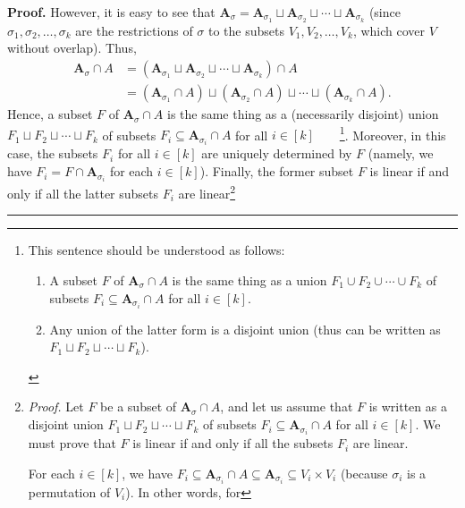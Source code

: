 \documentclass[numbers=enddot,12pt,final,onecolumn,notitlepage]{scrartcl}%
\numberwithin{exer}{section}
\theoremstyle{definition}
\newenvironment{proof}[1][Proof]{\noindent\textbf{#1.} }{\ \rule{0.5em}{0.5em}}
\newenvironment{vershort}{}{}
\begin{document}
\begin{vershort}
\begin{proof}
However, it is easy to see that $\mathbf{A}_{\sigma}=\mathbf{A}_{\sigma_{1}%
}\sqcup\mathbf{A}_{\sigma_{2}}\sqcup\cdots\sqcup\mathbf{A}_{\sigma_{k}}$
(since $\sigma_{1},\sigma_{2},\ldots,\sigma_{k}$ are the restrictions of
$\sigma$ to the subsets $V_{1},V_{2},\ldots,V_{k}$, which cover $V$ without
overlap). Thus,%
\begin{align*}
\mathbf{A}_{\sigma}\cap A  &  =\left(  \mathbf{A}_{\sigma_{1}}\sqcup
\mathbf{A}_{\sigma_{2}}\sqcup\cdots\sqcup\mathbf{A}_{\sigma_{k}}\right)  \cap
A\\
&  =\left(  \mathbf{A}_{\sigma_{1}}\cap A\right)  \sqcup\left(  \mathbf{A}%
_{\sigma_{2}}\cap A\right)  \sqcup\cdots\sqcup\left(  \mathbf{A}_{\sigma_{k}%
}\cap A\right)  .
\end{align*}
Hence, a subset $F$ of $\mathbf{A}_{\sigma}\cap A$ is the same thing as a
(necessarily disjoint) union $F_{1}\sqcup F_{2}\sqcup\cdots\sqcup F_{k}$ of
subsets $F_{i}\subseteq\mathbf{A}_{\sigma_{i}}\cap A$ for all $i\in\left[
k\right]  $\ \ \ \ \footnote{This sentence should be understood as follows:
\par
\begin{enumerate}
\item A subset $F$ of $\mathbf{A}_{\sigma}\cap A$ is the same thing as a union
$F_{1}\cup F_{2}\cup\cdots\cup F_{k}$ of subsets $F_{i}\subseteq
\mathbf{A}_{\sigma_{i}}\cap A$ for all $i\in\left[  k\right]  $.
\par
\item Any union of the latter form is a disjoint union (thus can be written as
$F_{1}\sqcup F_{2}\sqcup\cdots\sqcup F_{k}$).
\end{enumerate}
}. Moreover, in this case, the subsets $F_{i}$ for all $i\in\left[  k\right]
$ are uniquely determined by $F$ (namely, we have $F_{i}=F\cap\mathbf{A}%
_{\sigma_{i}}$ for each $i\in\left[  k\right]  $). Finally, the former subset
$F$ is linear if and only if all the latter subsets $F_{i}$ are
linear\footnote{\textit{Proof.} Let $F$ be a subset of $\mathbf{A}_{\sigma
}\cap A$, and let us assume that $F$ is written as a disjoint union
$F_{1}\sqcup F_{2}\sqcup\cdots\sqcup F_{k}$ of subsets $F_{i}\subseteq
\mathbf{A}_{\sigma_{i}}\cap A$ for all $i\in\left[  k\right]  $. We must prove
that $F$ is linear if and only if all the subsets $F_{i}$ are linear.
\par
For each $i\in\left[  k\right]  $, we have $F_{i}\subseteq\mathbf{A}%
_{\sigma_{i}}\cap A\subseteq\mathbf{A}_{\sigma_{i}}\subseteq V_{i}\times
V_{i}$ (because $\sigma_{i}$ is a permutation of $V_{i}$). In other words, for
}
\end{proof}
\end{vershort}
\end{document}
